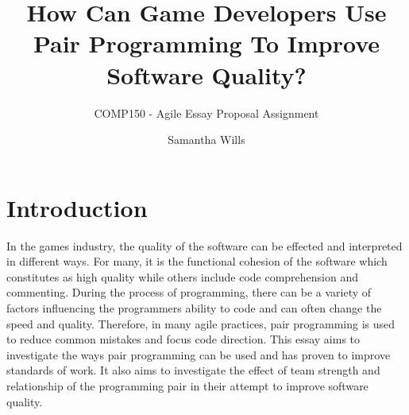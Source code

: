 \documentclass{scrartcl}
\title{How Can Game Developers Use Pair Programming To Improve Software Quality?}
\subtitle{COMP150 - Agile Essay Proposal Assignment}
\author{Samantha Wills}
\begin{document}
\maketitle

\section*{Introduction}
In the games industry, the quality of the software can be effected and interpreted in different ways. For many, it is the functional cohesion of the software which constitutes as high quality while others include code comprehension and commenting. During the process of programming, there can be a variety of factors influencing the programmers ability to code and can often change the speed and quality. Therefore, in many agile practices, pair programming is used to reduce common mistakes and focus code direction. This essay aims to investigate the ways pair programming can be used and has proven to improve standards of work. It also aims to investigate the effect of team strength and relationship of the programming pair in their attempt to improve software quality.
\end{document}
